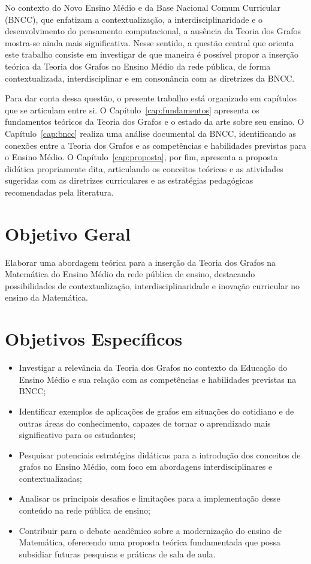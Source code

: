 \documentclass[
  12pt,
  oneside,
  a4paper,
  english,
  brazilian
  ]{abntex2}
\theoremstyle{definition}
\begin{document}
No contexto do Novo Ensino Médio e da Base Nacional Comum Curricular (BNCC), que
enfatizam a contextualização, a interdisciplinaridade e o desenvolvimento do
pensamento computacional, a ausência da Teoria dos Grafos mostra-se ainda mais
significativa. Nesse sentido, a questão central que orienta este trabalho consiste
em investigar de que maneira é possível propor a inserção teórica da Teoria dos
Grafos no Ensino Médio da rede pública, de forma contextualizada, interdisciplinar
e em consonância com as diretrizes da BNCC.

Para dar conta dessa questão, o presente trabalho está organizado em capítulos
que se articulam entre si. O Capítulo~\ref{cap:fundamentos} apresenta os
fundamentos teóricos da Teoria dos Grafos e o estado da arte sobre seu ensino.
O Capítulo~\ref{cap:bncc} realiza uma análise documental da BNCC, identificando
as conexões entre a Teoria dos Grafos e as competências e habilidades previstas
para o Ensino Médio. O Capítulo~\ref{cap:proposta}, por fim, apresenta a proposta
didática propriamente dita, articulando os conceitos teóricos e as atividades
sugeridas com as diretrizes curriculares e as estratégias pedagógicas
recomendadas pela literatura.

\section{Objetivo Geral}

Elaborar uma abordagem teórica para a inserção da Teoria dos Grafos na Matemática
do Ensino Médio da rede pública de ensino, destacando possibilidades de
contextualização, interdisciplinaridade e inovação curricular no ensino da
Matemática.

\section{Objetivos Específicos}

\begin{itemize}
  \item Investigar a relevância da Teoria dos Grafos no contexto da Educação do
        Ensino Médio e sua relação com as competências e habilidades previstas na
        BNCC;
 \item Identificar exemplos de aplicações de grafos em situações do cotidiano e
        de outras áreas do conhecimento, capazes de tornar o aprendizado mais
        significativo para os estudantes;
 \item Pesquisar potenciais estratégias didáticas para a introdução dos conceitos
        de grafos no Ensino Médio, com foco em abordagens interdisciplinares e
        contextualizadas;
 \item Analisar os principais desafios e limitações para a implementação desse
        conteúdo na rede pública de ensino;
 \item Contribuir para o debate acadêmico sobre a modernização do ensino de
        Matemática, oferecendo uma proposta teórica fundamentada que possa
        subsidiar futuras pesquisas e práticas de sala de aula.
 \end{itemize}
\end{document}
